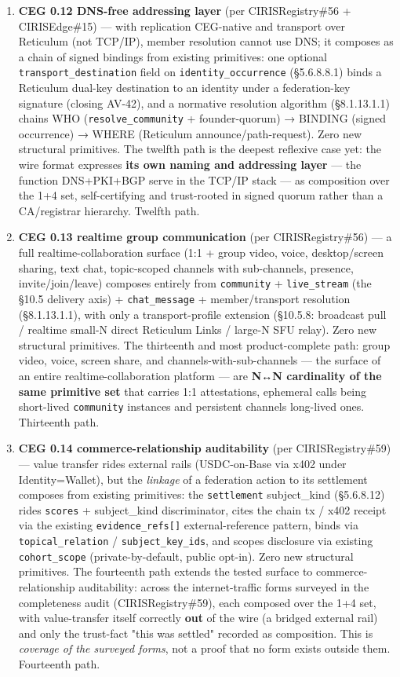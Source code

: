 \documentclass[10pt]{article}
\begin{document}
\begin{enumerate}
\item \textbf{CEG 0.12 DNS-free addressing layer} (per CIRISRegistry\#56 + CIRISEdge\#15) — with replication CEG-native and transport over Reticulum (not TCP/IP), member resolution cannot use DNS; it composes as a chain of signed bindings from existing primitives: one optional \texttt{transport\_destination} field on \texttt{identity\_occurrence} (§5.6.8.8.1) binds a Reticulum dual-key destination to an identity under a federation-key signature (closing AV-42), and a normative resolution algorithm (§8.1.13.1.1) chains WHO (\texttt{resolve\_community} + founder-quorum) → BINDING (signed occurrence) → WHERE (Reticulum announce/path-request). Zero new structural primitives. The twelfth path is the deepest reflexive case yet: the wire format expresses \textbf{its own naming and addressing layer} — the function DNS+PKI+BGP serve in the TCP/IP stack — as composition over the 1+4 set, self-certifying and trust-rooted in signed quorum rather than a CA/registrar hierarchy. Twelfth path.
\item \textbf{CEG 0.13 realtime group communication} (per CIRISRegistry\#56) — a full realtime-collaboration surface (1:1 + group video, voice, desktop/screen sharing, text chat, topic-scoped channels with sub-channels, presence, invite/join/leave) composes entirely from \texttt{community} + \texttt{live\_stream} (the §10.5 delivery axis) + \texttt{chat\_message} + member/transport resolution (§8.1.13.1.1), with only a transport-profile extension (§10.5.8: broadcast pull / realtime small-N direct Reticulum Links / large-N SFU relay). Zero new structural primitives. The thirteenth and most product-complete path: group video, voice, screen share, and channels-with-sub-channels — the surface of an entire realtime-collaboration platform — are \textbf{N↔N cardinality of the same primitive set} that carries 1:1 attestations, ephemeral calls being short-lived \texttt{community} instances and persistent channels long-lived ones. Thirteenth path.
\item \textbf{CEG 0.14 commerce-relationship auditability} (per CIRISRegistry\#59) — value transfer rides external rails (USDC-on-Base via x402 under Identity=Wallet), but the \textit{linkage} of a federation action to its settlement composes from existing primitives: the \texttt{settlement} subject\_kind (§5.6.8.12) rides \texttt{scores} + subject\_kind discriminator, cites the chain tx / x402 receipt via the existing \texttt{evidence\_refs[]} external-reference pattern, binds via \texttt{topical\_relation} / \texttt{subject\_key\_ids}, and scopes disclosure via existing \texttt{cohort\_scope} (private-by-default, public opt-in). Zero new structural primitives. The fourteenth path extends the tested surface to commerce-relationship auditability: across the internet-traffic forms surveyed in the completeness audit (CIRISRegistry\#59), each composed over the 1+4 set, with value-transfer itself correctly \textbf{out} of the wire (a bridged external rail) and only the trust-fact "this was settled" recorded as composition. This is \textit{coverage of the surveyed forms}, not a proof that no form exists outside them. Fourteenth path.

\end{enumerate}
\end{document}
